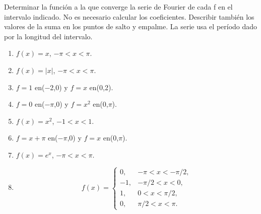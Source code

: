 Determinar la función a la que converge la serie de Fourier de cada f en el intervalo indicado.
No es necesario calcular los coeficientes. Describir también los valores de la suma en los puntos de salto y empalme. La serie usa el período dado por la longitud del intervalo.

\begin{enumerate}[label=(\alph*),ref=\alph*,leftmargin=*]
\item \(f(x)=x\), \(-\pi<x<\pi\).
\item \(f(x)=|x|\), \(-\pi<x<\pi\).
\item \(f=1\) en(\ensuremath{-}2,0) y \(f=x\) en(0,2).
\item \(f=0\) en(\ensuremath{-}\ensuremath{\pi},0) y \(f=x^2\) en(0,\ensuremath{\pi}).
\item \(f(x)=x^2\), \(-1<x<1\).
\item \(f=x+\pi\) en(\ensuremath{-}\ensuremath{\pi},0) y \(f=x\) en(0,\ensuremath{\pi}).
\item \(f(x)=e^x\), \(-\pi<x<\pi\).
\item \[f(x)=\begin{cases}0,&-\pi<x<-\pi/2,\\-1,&-\pi/2<x<0,\\1,&0<x<\pi/2,\\0,&\pi/2<x<\pi.\end{cases}\]
\end{enumerate}
